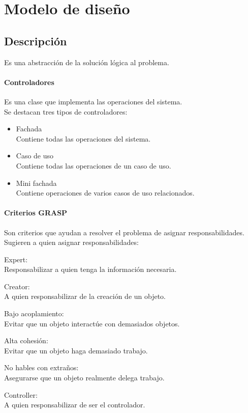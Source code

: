 \documentclass[a4paper,12pt,oneside]{report}
\begin{document}

    \section{Modelo de dise\~no}
      \subsection{Descripci\'on}
        Es una abstracci\'on de la soluci\'on l\'ogica al problema.

        \paragraph{Controladores}
          Es una clase que implementa las operaciones del sistema.\\
          Se destacan tres tipos de controladores:
          \begin{itemize}
            \item Fachada\\
                    Contiene todas las operaciones del sistema.
            \item Caso de uso\\
                    Contiene todas las operaciones de un caso de uso.
            \item Mini fachada\\
                    Contiene operaciones de varios casos de uso relacionados.
          \end{itemize}

        \paragraph{Criterios GRASP}
          Son criterios que ayudan a resolver el problema de asignar
          responsabilidades.\\
          Sugieren a quien asignar responsabilidades:
          \begin{description}
            \item Expert:\\
                    Responsabilizar a quien tenga la informaci\'on necesaria.
            \item Creator:\\
                    A quien responsabilizar de la creaci\'on de un objeto.
            \item Bajo acoplamiento:\\
                    Evitar que un objeto interact\'ue con demasiados objetos.
            \item Alta cohesi\'on:\\
                    Evitar que un objeto haga demasiado trabajo.
            \item No hables con extra\~nos:\\
                    Asegurarse que un objeto realmente delega trabajo.
            \item Controller:\\
                    A quien responsabilizar de ser el controlador.
          \end{description}
\end{document}
